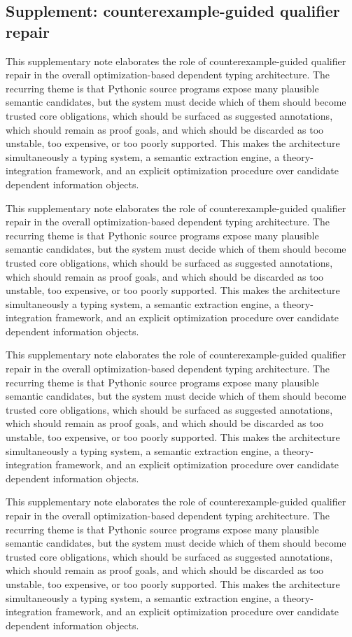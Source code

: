 \documentclass[11pt]{article}
\theoremstyle{definition}
\theoremstyle{plain}
\begin{document}
\subsection{Supplement: counterexample-guided qualifier repair}
This supplementary note elaborates the role of counterexample-guided qualifier repair in the overall
optimization-based dependent typing architecture. The recurring theme is that
Pythonic source programs expose many plausible semantic candidates, but the
system must decide which of them should become trusted core obligations, which
should be surfaced as suggested annotations, which should remain as proof
goals, and which should be discarded as too unstable, too expensive, or too
poorly supported. This makes the architecture simultaneously a typing system,
a semantic extraction engine, a theory-integration framework, and an explicit
optimization procedure over candidate dependent information objects.

This supplementary note elaborates the role of counterexample-guided qualifier repair in the overall
optimization-based dependent typing architecture. The recurring theme is that
Pythonic source programs expose many plausible semantic candidates, but the
system must decide which of them should become trusted core obligations, which
should be surfaced as suggested annotations, which should remain as proof
goals, and which should be discarded as too unstable, too expensive, or too
poorly supported. This makes the architecture simultaneously a typing system,
a semantic extraction engine, a theory-integration framework, and an explicit
optimization procedure over candidate dependent information objects.

This supplementary note elaborates the role of counterexample-guided qualifier repair in the overall
optimization-based dependent typing architecture. The recurring theme is that
Pythonic source programs expose many plausible semantic candidates, but the
system must decide which of them should become trusted core obligations, which
should be surfaced as suggested annotations, which should remain as proof
goals, and which should be discarded as too unstable, too expensive, or too
poorly supported. This makes the architecture simultaneously a typing system,
a semantic extraction engine, a theory-integration framework, and an explicit
optimization procedure over candidate dependent information objects.

This supplementary note elaborates the role of counterexample-guided qualifier repair in the overall
optimization-based dependent typing architecture. The recurring theme is that
Pythonic source programs expose many plausible semantic candidates, but the
system must decide which of them should become trusted core obligations, which
should be surfaced as suggested annotations, which should remain as proof
goals, and which should be discarded as too unstable, too expensive, or too
poorly supported. This makes the architecture simultaneously a typing system,
a semantic extraction engine, a theory-integration framework, and an explicit
optimization procedure over candidate dependent information objects.
\end{document}
